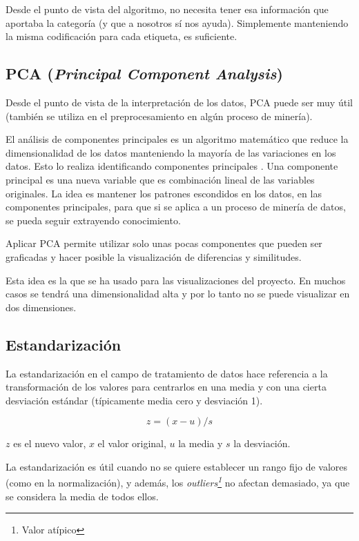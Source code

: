 Desde el punto de vista del algoritmo, no necesita tener esa información que
aportaba la categoría (y que a nosotros sí nos ayuda). Simplemente manteniendo
la misma codificación para cada etiqueta, es suficiente.

\subsection{PCA (\textit{Principal Component Analysis})} 

Desde el punto de vista de la interpretación de los datos, PCA puede ser muy
útil (también se utiliza en el preprocesamiento en algún proceso de minería).

El análisis de componentes principales es un algoritmo matemático que reduce la
dimensionalidad de los datos manteniendo la mayoría de las variaciones en los
datos. Esto lo realiza identificando componentes principales
\cite{ringner2008principal}. Una componente principal es una nueva variable que
es combinación lineal de las variables originales. La idea es mantener los
patrones escondidos en los datos, en las componentes principales, para que si se
aplica a un proceso de minería de datos, se pueda seguir extrayendo
conocimiento.

Aplicar PCA permite utilizar solo unas pocas componentes que pueden ser
graficadas y hacer posible la visualización de diferencias y similitudes.

Esta idea es la que se ha usado para las visualizaciones del proyecto. En muchos
casos se tendrá una dimensionalidad alta y por lo tanto no se puede visualizar
en dos dimensiones.

\subsection{Estandarización}

La estandarización en el campo de tratamiento de datos hace referencia a la
transformación de los valores para centrarlos en una media y con una cierta
desviación estándar (típicamente media cero y desviación 1).

\begin{equation}
  z = (x - u) / s
\end{equation}

$z$ es el nuevo valor, $x$ el valor original, $u$ la media y $s$ la desviación.

La estandarización es útil cuando no se quiere establecer un rango fijo  de
valores (como en la normalización), y además, los
\textit{outliers\footnote{Valor atípico}} no afectan demasiado, ya que se
considera la media de todos ellos.

